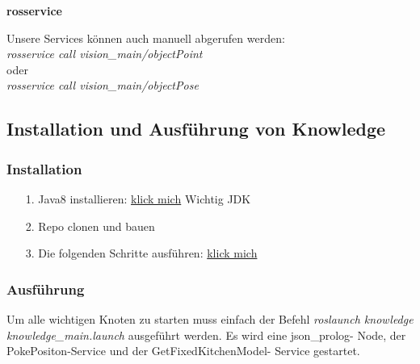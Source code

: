 \documentclass{suturo}
\begin{document}
\textbf{rosservice}

Unsere Services k\"onnen auch manuell abgerufen werden: \\

\textit{rosservice call vision\_main/objectPoint} \\

oder \\

\textit{rosservice call vision\_main/objectPose}

\subsection{Installation und Ausführung von Knowledge}

\subsubsection{Installation}

\begin{itemize}
\item[1.] Java8 installieren: \href{https://wiki.ubuntuusers.de/Java/Installation/Oracle_Java/Java_8/}{klick mich} Wichtig JDK
\item[2.] Repo clonen und bauen
\item[3.] Die folgenden Schritte ausführen: \href{http://knowrob.org/installation/workspace}{klick mich}
\end{itemize}

\subsubsection{Ausführung}

Um alle wichtigen Knoten zu starten muss einfach der Befehl \textit{roslaunch knowledge knowledge\_main.launch} ausgeführt werden. Es wird eine json\_prolog- Node, der PokePositon-Service und der GetFixedKitchenModel- Service gestartet.
\end{document}
